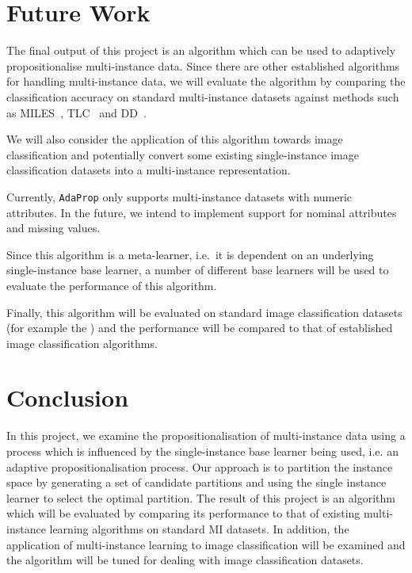 \documentclass[a4paper,12pt]{article} %
\newcommand{\AdaProp}{\texttt{AdaProp}\xspace}
\begin{document}
\section{Future Work}

The final output of this project is an algorithm 
    which can be used to adaptively propositionalise multi-instance data. 
Since there are other established algorithms for handling multi-instance data, 
    we will evaluate the algorithm by comparing the classification accuracy 
    on standard multi-instance datasets against methods such as 
    MILES~\cite{Chen2006}, TLC~\cite{Weidmann2003} and DD~\cite{Maron98mil}.

We will also consider the application of this algorithm towards image classification and 
    potentially convert some existing single-instance image classification
    datasets into a multi-instance representation.

Currently, \AdaProp only supports multi-instance datasets with 
    numeric attributes.
In the future, we intend to implement support for
    nominal attributes and missing values.

Since this algorithm is a meta-learner, 
    i.e.\ it is dependent on an underlying single-instance base learner, 
    a number of different base learners will be 
    used to evaluate the performance of this algorithm.
 
Finally, this algorithm will be evaluated on 
    standard image classification datasets 
    (for example the ) and 
    the performance will be compared to that of 
    established image classification algorithms.

\section{Conclusion}
In this project, 
    we examine the propositionalisation of multi-instance data using 
    a process which is influenced by the single-instance base learner being used, 
    i.e. an adaptive propositionalisation process. 
Our approach is to partition the instance space 
    by generating a set of candidate partitions and 
    using the single instance learner to select the optimal partition. 
The result of this project is an algorithm
    which will be evaluated by comparing its performance to 
    that of existing multi-instance learning algorithms on standard MI datasets. 
In addition, 
    the application of multi-instance learning 
    to image classification will be examined and 
    the algorithm will be tuned for dealing with image classification datasets.
\clearpage
 

\end{document}
